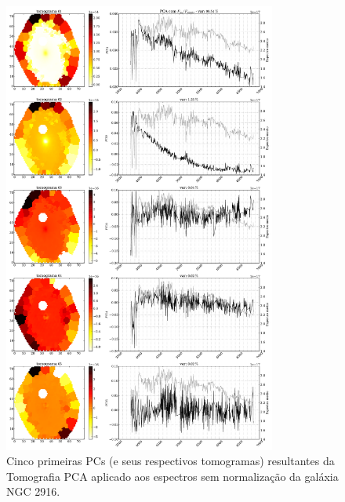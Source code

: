 \begin{figure}
    \includegraphics[width=0.8\textwidth]{figuras/K0277-tomo-obs.pdf}
    \caption[Tomogramas de 1 a 5 da gal\'axia NGC 2916 - $F_{obs}$.]
    {Cinco primeiras PCs (e seus respectivos tomogramas) resultantes da Tomografia PCA aplicado aos espectros sem
    normalização da galáxia NGC 2916.}
    \label{fig:K0277tomofobs}
\end{figure}

